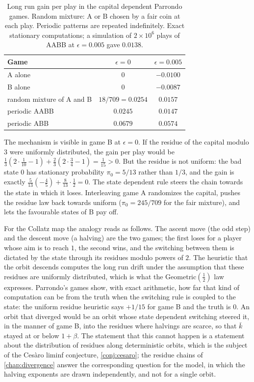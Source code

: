 \begin{table}[t]
\centering
\caption{Long run gain per play in the capital dependent Parrondo games.
Random mixture: A or B chosen by a fair coin at each play. Periodic patterns
are repeated indefinitely. Exact stationary computations; a simulation of
$2\times10^6$ plays of AABB at $\epsilon=0.005$ gave $0.0138$.}
\label{tab:ch5:parrondo}
\begin{tabular}{lcc}
\toprule
Game & $\epsilon=0$ & $\epsilon=0.005$\\
\midrule
A alone & $0$ & $-0.0100$\\
B alone & $0$ & $-0.0087$\\
random mixture of A and B & $18/709=0.0254$ & $0.0157$\\
periodic AABB & $0.0245$ & $0.0147$\\
periodic ABB & $0.0679$ & $0.0574$\\
\bottomrule
\end{tabular}
\end{table}

The mechanism is visible in game B at $\epsilon=0$.  If the residue of the
capital modulo $3$ were uniformly distributed, the gain per play would be
$\tfrac13(2\cdot\tfrac1{10}-1)+\tfrac23(2\cdot\tfrac34-1)=\tfrac1{15}>0$.
But the residue is not uniform: the bad state $0$ has stationary probability
$\pi_0=5/13$ rather than $1/3$, and the gain is exactly
$\tfrac5{13}(-\tfrac45)+\tfrac8{13}\cdot\tfrac12=0$.  The state dependent rule
steers the chain towards the state in which it loses.  Interleaving game A
randomizes the capital, pushes the residue law back towards uniform
($\pi_0=245/709$ for the fair mixture), and lets the favourable states of B pay
off.

For the Collatz map the analogy reads as follows.  The ascent move (the odd
step) and the descent move (a halving) are the two games; the first loses for
a player whose aim is to reach $1$, the second wins, and the switching between
them is dictated by the state through its residues modulo powers of $2$.  The
heuristic that the orbit descends computes the long run drift under the
assumption that these residues are uniformly distributed, which is what the
Geometric$(\tfrac12)$ law expresses.  Parrondo's games show, with exact
arithmetic, how far that kind of computation can be from the truth when the
switching rule is coupled to the state: the uniform residue heuristic says
$+1/15$ for game B and the truth is $0$.  An orbit that diverged would be an
orbit whose state dependent switching steered it, in the manner of game B,
into the residues where halvings are scarce, so that $\bar k$ stayed at or
below $1+\beta$.  The statement that this cannot happen is a statement about
the distribution of residues along deterministic orbits, which is the subject
of the Ces\`aro liminf conjecture, \cref{conj:cesaro};
the residue chains of \cref{chap:divergence} answer the
corresponding question for the model, in which the halving exponents are drawn
independently, and not for a single orbit.

